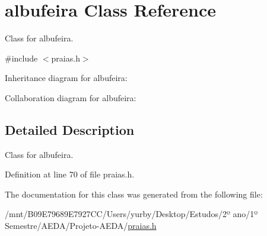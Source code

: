 \hypertarget{classalbufeira}{}\section{albufeira Class Reference}
\label{classalbufeira}


Class for albufeira.  




{\ttfamily \#include $<$praias.\+h$>$}



Inheritance diagram for albufeira\+:


Collaboration diagram for albufeira\+:


\subsection{Detailed Description}
Class for albufeira. 

Definition at line 70 of file praias.\+h.



The documentation for this class was generated from the following file\+:\begin{DoxyCompactItemize}
\item 
/mnt/\+B09\+E79689\+E7927\+C\+C/\+Users/yurby/\+Desktop/\+Estudos/2º ano/1º Semestre/\+A\+E\+D\+A/\+Projeto-\/\+A\+E\+D\+A/\hyperlink{praias_8h}{praias.\+h}\end{DoxyCompactItemize}
